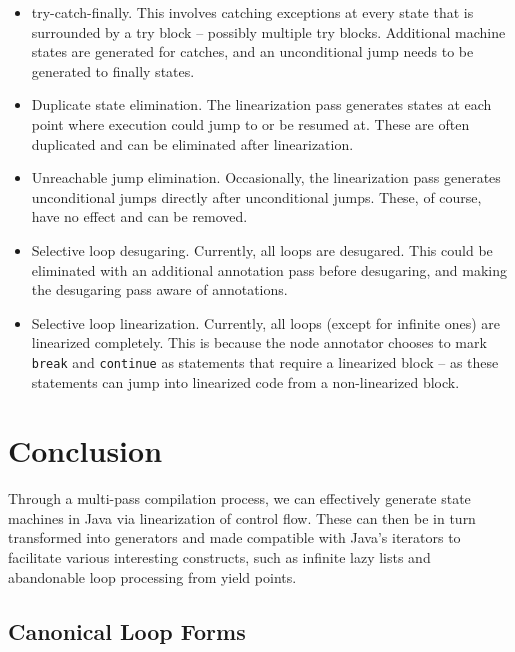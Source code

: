 \documentclass[journal,a4paper]{IEEEtran}
\begin{document}
\begin{itemize}
\item try-catch-finally. This involves catching exceptions at every state that is surrounded by
      a try block -- possibly multiple try blocks. Additional machine states are generated for
      catches, and an unconditional jump needs to be generated to finally states.

\item Duplicate state elimination. The linearization pass generates states at each point where
      execution could jump to or be resumed at. These are often duplicated and can be eliminated
      after linearization.

\item Unreachable jump elimination. Occasionally, the linearization pass generates unconditional
      jumps directly after unconditional jumps. These, of course, have no effect and can be
      removed.

\item Selective loop desugaring. Currently, all loops are desugared. This could be eliminated with
      an additional annotation pass before desugaring, and making the desugaring pass aware of
      annotations.

\item Selective loop linearization. Currently, all loops (except for infinite ones) are linearized
      completely. This is because the node annotator chooses to mark \texttt{break} and
      \texttt{continue} as statements that require a linearized block -- as these statements can
      jump into linearized code from a non-linearized block.
\end{itemize}

\section{Conclusion}

Through a multi-pass compilation process, we can effectively generate state machines in Java via
linearization of control flow. These can then be in turn transformed into generators and made
compatible with Java's iterators to facilitate various interesting constructs, such as infinite
lazy lists and abandonable loop processing from yield points.

\appendix
\subsection{Canonical Loop Forms} \label{appendix:canonical-loop-forms}
\end{document}
